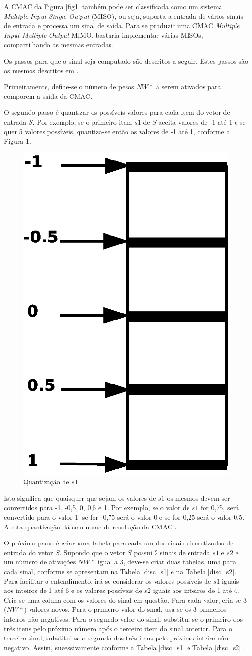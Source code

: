 A CMAC da Figura \ref{fig1} também pode ser classificada como um sistema \emph{Multiple Input Single Output} (MISO), ou seja, suporta a entrada de vários sinais de entrada e processa um sinal de saída.
Para se produzir uma CMAC \emph{Multiple Input Multiple Output} MIMO, bastaria implementar várias MISOs, compartilhando as mesmas entradas.


Os passos para que o sinal seja computado são descritos a seguir. Estes passos são os mesmos descritos em .

Primeiramente, define-se o número de pesos $NW*$ a serem ativados para comporem a saída da CMAC.

O segundo passo é quantizar os possíveis valores para cada item do vetor de entrada $S$.
Por exemplo, se o primeiro item $s1$ de $S$ aceita valores de -1 até 1 e se quer 5 valores possíveis, quantiza-se então os valores de -1 até 1, conforme a Figura \ref{inputs1}.


\begin{figure}[ht]
	\centering
	\includegraphics[width=3 cm]{figuras/input.eps}
	\caption{Quantização de $s1$.}
    	\label{inputs1}
\end{figure}


Isto significa que quaisquer que sejam os valores de $s1$ os mesmos devem ser convertidos para -1, -0,5, 0, 0,5 e 1. 
Por exemplo, se o valor de $s1$ for 0,75, será convertido para o valor 1, se for -0,75 será o valor 0 e se for 0,25 será o valor 0,5. A esta quantização dá-se o nome de resolução da CMAC \cite{Albus1975b}.

O próximo passo é criar uma tabela para cada um dos sinais discretizados de entrada do vetor $S$. 
Supondo que o vetor $S$ possui 2 sinais de entrada $s1$ e $s2$ e um número de ativações $NW*$ igual a 3, deve-se criar duas tabelas, uma para cada sinal, conforme se apresentam na Tabela \ref{disc_s1} e na Tabela \ref{disc_s2}. 
Para facilitar o entendimento, irá se considerar os valores possíveis de $s1$ iguais aos inteiros de 1 até 6 e os valores possíveis de $s2$ iguais aos inteiros de 1 até 4.
Cria-se uma coluna com os valores do sinal em questão. 
Para cada valor, cria-se 3 ($NW*$) valores novos. 
Para o primeiro valor do sinal, usa-se os 3 primeiros inteiros não negativos.
Para o segundo valor do sinal, substitui-se o primeiro dos três itens pelo próximo número após o terceiro item do sinal anterior. 
Para o terceiro sinal, substitui-se o segundo dos três itens pelo próximo inteiro não negativo.
Assim, sucessivamente conforme a Tabela \ref{disc_s1} e Tabela \ref{disc_s2} \cite{Albus1975b}.

